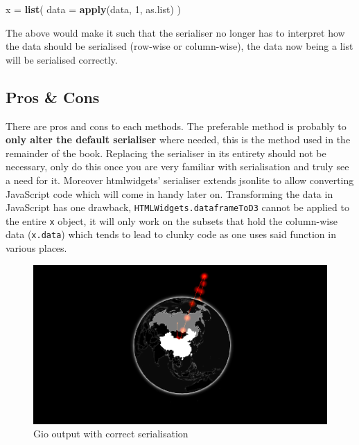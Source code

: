 \documentclass[
]{krantz}
\makeatletter
\newenvironment{Shaded}{\begin{snugshade}}{\end{snugshade}}
\newcommand{\DataTypeTok}[1]{\textcolor[rgb]{0.27,0.27,0.27}{#1}}
\newcommand{\DecValTok}[1]{\textcolor[rgb]{0.06,0.06,0.06}{#1}}
\newcommand{\KeywordTok}[1]{\textcolor[rgb]{0.27,0.27,0.27}{\textbf{#1}}}
\newcommand{\NormalTok}[1]{#1}
\newcommand{\StringTok}[1]{\textcolor[rgb]{0.5,0.5,0.5}{#1}}
\newenvironment{kframe}{%
\medskip{}
\setlength{\fboxsep}{.8em}
 \def\at@end@of@kframe{}%
 \ifinner\ifhmode%
  \def\at@end@of@kframe{\end{minipage}}%
  \begin{minipage}{\columnwidth}%
 \fi\fi%
 \def\FrameCommand##1{\hskip\@totalleftmargin \hskip-\fboxsep
 \colorbox{shadecolor}{##1}\hskip-\fboxsep
     \hskip-\linewidth \hskip-\@totalleftmargin \hskip\columnwidth}%
 \MakeFramed {\advance\hsize-\width
   \@totalleftmargin\z@ \linewidth\hsize
   \@setminipage}}%
 {\par\unskip\endMakeFramed%
 \at@end@of@kframe}
\renewenvironment{Shaded}{\begin{kframe}}{\end{kframe}}
\makeatother
\begin{document}
\begin{Shaded}
\begin{Highlighting}[]
\NormalTok{x =}\StringTok{ }\KeywordTok{list}\NormalTok{(}
  \DataTypeTok{data =} \KeywordTok{apply}\NormalTok{(data, }\DecValTok{1}\NormalTok{, as.list)}
\NormalTok{)}
\end{Highlighting}
\end{Shaded}

The above would make it such that the serialiser no longer has to interpret how the data should be serialised (row-wise or column-wise), the data now being a list will be serialised correctly.

\hypertarget{widgets-full-transform-data-conclusion}{%
\subsection{Pros \& Cons}\label{widgets-full-transform-data-conclusion}}

There are pros and cons to each methods. The preferable method is probably to \textbf{only alter the default serialiser} where needed, this is the method used in the remainder of the book. Replacing the serialiser in its entirety should not be necessary, only do this once you are very familiar with serialisation and truly see a need for it. Moreover htmlwidgets' serialiser extends jsonlite to allow converting JavaScript code which will come in handy later on. Transforming the data in JavaScript has one drawback, \texttt{HTMLWidgets.dataframeToD3} cannot be applied to the entire \texttt{x} object, it will only work on the subsets that hold the column-wise data (\texttt{x.data}) which tends to lead to clunky code as one uses said function in various places.

\begin{figure}
\centering
\includegraphics{images/gio-data.png}
\caption{Gio output with correct serialisation}
\end{figure}
\end{document}
